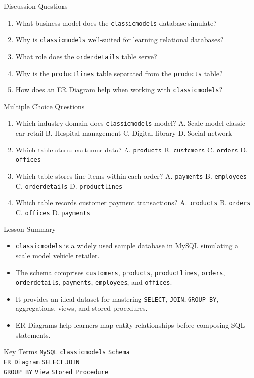 \documentclass[aspectratio=169,professionalfonts]{beamer}
\newcommand{\code}[1]{\texttt{#1}}
\begin{document}
\begin{frame}{Discussion Questions}
\begin{enumerate}
  \item What business model does the \code{classicmodels} database simulate?
  \item Why is \code{classicmodels} well-suited for learning relational databases?
  \item What role does the \code{orderdetails} table serve?
  \item Why is the \code{productlines} table separated from the \code{products} table?
  \item How does an ER Diagram help when working with \code{classicmodels}?
\end{enumerate}
\end{frame}

\begin{frame}{Multiple Choice Questions}
\small
\begin{enumerate}
  \item Which industry domain does \code{classicmodels} model?\newline
  A. Scale model classic car retail \quad B. Hospital management \quad C. Digital library \quad D. Social network
  \item Which table stores customer data?\newline
  A. \code{products} \quad B. \code{customers} \quad C. \code{orders} \quad D. \code{offices}
  \item Which table stores line items within each order?\newline
  A. \code{payments} \quad B. \code{employees} \quad C. \code{orderdetails} \quad D. \code{productlines}
  \item Which table records customer payment transactions?\newline
  A. \code{products} \quad B. \code{orders} \quad C. \code{offices} \quad D. \code{payments}
\end{enumerate}
\end{frame}

\begin{frame}{Lesson Summary}
\begin{itemize}
  \item \code{classicmodels} is a widely used sample database in MySQL simulating a scale model vehicle retailer.
  \item The schema comprises \code{customers}, \code{products}, \code{productlines}, \code{orders}, \code{orderdetails}, \code{payments}, \code{employees}, and \code{offices}.
  \item It provides an ideal dataset for mastering \code{SELECT}, \code{JOIN}, \code{GROUP BY}, aggregations, views, and stored procedures.
  \item ER Diagrams help learners map entity relationships before composing SQL statements.
\end{itemize}
\end{frame}

\begin{frame}{Key Terms}
\centering
\Large
\code{MySQL} \quad \code{classicmodels} \quad \code{Schema} \\
\vspace{0.5em}
\code{ER Diagram} \quad \code{SELECT} \quad \code{JOIN} \\
\vspace{0.5em}
\code{GROUP BY} \quad \code{View} \quad \code{Stored Procedure}
\end{frame}
\end{document}
